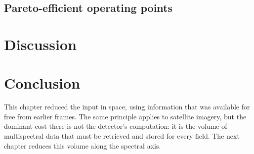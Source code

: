 \subsection{Pareto-efficient operating points}

\section{Discussion}

\section{Conclusion}

\begin{bridge}
This chapter reduced the input in space, using information that was available
for free from earlier frames. The same principle applies to satellite imagery,
but the dominant cost there is not the detector's computation: it is the volume
of multispectral data that must be retrieved and stored for every field. The
next chapter reduces this volume along the spectral axis.
\end{bridge}
